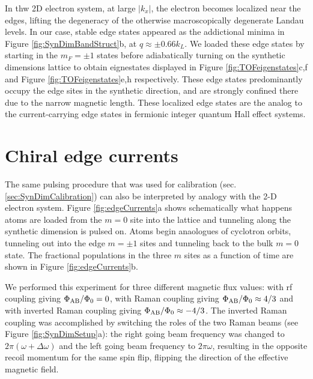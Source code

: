 In thw 2D electron system, at large $|k_x|$, the electron becomes localized near the edges, lifting the degeneracy of the otherwise macroscopically degenerate Landau levels. In our case, stable edge states appeared as the addictional minima in Figure \ref{fig:SynDimBandStruct}b, at $q\approx\pm0.66 k_L$. We loaded these edge states by starting in the $m_F=\pm1$ states before adiabatically turning on the synthetic dimensions lattice to obtain eignestates displayed in Figure \ref{fig:TOFeigenstates}c,f and Figure \ref{fig:TOFeigenstates}e,h respectively. These edge states predominantly occupy the edge sites in the synthetic direction, and are strongly confined there due to the narrow magnetic length. These localized edge states are the analog to the current-carrying edge states in fermionic integer quantum Hall effect systems\cite{Hugel2014}.

\section{Chiral edge currents}

The same pulsing procedure that was used for calibration (sec. \ref{sec:SynDimCalibration}) can also be interpreted by analogy with the 2-D electron system. Figure \ref{fig:edgeCurrents}a shows schematically what happens atoms are loaded from the $m=0$ site into the lattice and tunneling along the synthetic dimension is pulsed on. Atoms begin anaologues of cyclotron orbits, tunneling out into the edge $m=\pm1$ sites and tunneling back to the  bulk $m=0$ state. The fractional populations in the three $m$ sites as a function of time are shown in Figure \ref{fig:edgeCurrents}b. 

We performed this experiment for three different magnetic flux values: with rf coupling giving $\Phi_{\rm AB}/\Phi_0=0$, with Raman coupling giving $\Phi_{\rm AB}/\Phi_0\approx4/3$ and with inverted Raman coupling giving $\Phi_{\rm AB}/\Phi_0\approx-4/3$.
The inverted Raman coupling was accomplished by switching the roles of the two Raman beams (see Figure \ref{fig:SynDimSetup}a): the right going beam frequency was changed to $2\pi (\omega + \Delta\omega)$ and the left going beam frequency to $2\pi\omega$, resulting in the opposite recoil momentum for the same spin flip, flipping the direction of the effective magnetic field. 


